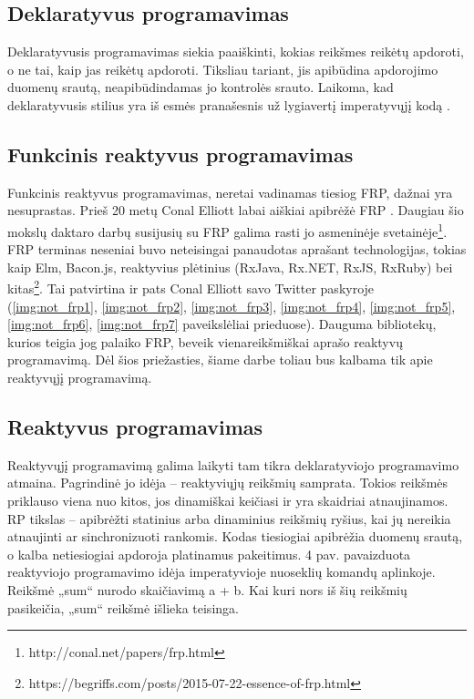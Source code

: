 \subsection{Deklaratyvus programavimas}

Deklaratyvusis programavimas siekia paaiškinti, kokias reikšmes reikėtų apdoroti, o ne tai, kaip jas reikėtų apdoroti. Tiksliau tariant, jis apibūdina apdorojimo duomenų srautą, neapibūdindamas jo kontrolės srauto. Laikoma, kad deklaratyvusis stilius yra iš esmės pranašesnis už lygiavertį imperatyvųjį kodą \cite{DeclarativeProgramming}.

\subsection{Funkcinis reaktyvus programavimas}

Funkcinis reaktyvus programavimas, neretai vadinamas tiesiog FRP, dažnai yra nesuprastas. Prieš 20 metų Conal Elliott labai aiškiai apibrėžė FRP \cite{ElliottHudak97:Fran}. Daugiau šio mokslų daktaro darbų susijusių su FRP galima rasti jo asmeninėje svetainėje\footnote{http://conal.net/papers/frp.html}. FRP terminas neseniai buvo neteisingai panaudotas aprašant technologijas, tokias kaip Elm, Bacon.js, reaktyvius plėtinius (RxJava, Rx.NET, RxJS, RxRuby) bei kitas\footnote{https://begriffs.com/posts/2015-07-22-essence-of-frp.html}. Tai patvirtina ir pats Conal Elliott savo Twitter paskyroje (\ref{img:not_frp1}, \ref{img:not_frp2}, \ref{img:not_frp3}, \ref{img:not_frp4}, \ref{img:not_frp5}, \ref{img:not_frp6}, \ref{img:not_frp7} paveikslėliai prieduose). Dauguma bibliotekų, kurios teigia jog palaiko FRP, beveik vienareikšmiškai aprašo reaktyvų programavimą. Dėl šios priežasties, šiame darbe toliau bus kalbama tik apie reaktyvųjį programavimą.

\subsection{Reaktyvus programavimas}

Reaktyvųjį programavimą galima laikyti tam tikra deklaratyviojo programavimo atmaina. Pagrindinė jo idėja – reaktyviųjų reikšmių samprata. Tokios reikšmės priklauso viena nuo kitos, jos dinamiškai keičiasi ir yra skaidriai atnaujinamos. RP tikslas – apibrėžti statinius arba dinaminius reikšmių ryšius, kai jų nereikia atnaujinti ar sinchronizuoti rankomis. Kodas tiesiogiai apibrėžia duomenų srautą, o kalba netiesiogiai apdoroja platinamus pakeitimus. 4 pav. pavaizduota reaktyviojo programavimo idėja imperatyvioje nuoseklių komandų aplinkoje. Reikšmė „sum“ nurodo skaičiavimą a + b. Kai kuri nors iš šių reikšmių pasikeičia, „sum“ reikšmė išlieka teisinga.

